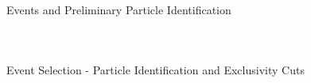 \documentclass[aspectratio=169]{beamer}
\newcommand*{\myfont}{\fontfamily{lmtt}\selectfont}
\begin{document}
\begin{frame}{Events and Preliminary Particle Identification}
\begin{columns}[t, onlytextwidth]
\begin{columns}[t, onlytextwidth]
\begin{figure}[t!]
                    
                    
                             \end{figure}
               
              
        \end{columns}
          \centering
        {\myfont{\tiny [S. Lee] }}

        \end{columns}
\end{frame}    



\begin{frame}{Event Selection - Particle Identification and Exclusivity Cuts}


\end{frame}
\end{document}
